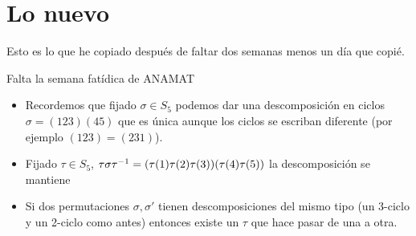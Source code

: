 
\chapter{Lo nuevo}

Esto es lo que he copiado después de faltar dos semanas menos un día que copié.

Falta la semana fatídica de ANAMAT\newline

\begin{itemize}
	\item Recordemos que fijado $\sigma \in S_5$ podemos dar una descomposición en ciclos $\sigma = (123)(45)$ que es única aunque los ciclos se escriban diferente (por ejemplo $(123) = (231)$).
	
	\item Fijado $\tau \in S_5$, $\tau \sigma \tau^{-1} = (\tau(1)\tau(2)\tau(3))(\tau(4)\tau(5))$ la descomposición se mantiene
	
	\item Si dos permutaciones $\sigma, \sigma'$ tienen descomposiciones del mismo tipo (un 3-ciclo y un 2-ciclo como antes) entonces existe un $\tau$ que hace pasar de una a otra.
\end{itemize}

